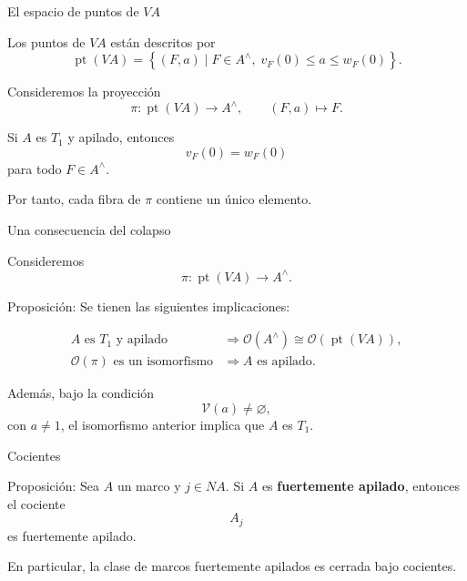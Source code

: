 \documentclass[compress,12pt]{beamer}
\begin{document}
\begin{frame}{El espacio de puntos de \(VA\)}

Los puntos de \(VA\) están descritos por
\[
    \operatorname{pt}(VA)
    =
    \left\{
        (F,a)\mid
        F\in A^\wedge,\;
        v_F(0)\leq a\leq w_F(0)
    \right\}.
\]

Consideremos la proyección
\[
    \pi\colon \operatorname{pt}(VA)\longrightarrow A^\wedge,
    \qquad
    (F,a)\longmapsto F.
\]

Si \(A\) es \(T_1\) y apilado, entonces
\[
    v_F(0)=w_F(0)
\]
para todo \(F\in A^\wedge\).

Por tanto, cada fibra de \(\pi\) contiene un único elemento.

\end{frame}

\begin{frame}{Una consecuencia del colapso}

Consideremos
\[
    \pi\colon\operatorname{pt}(VA)\longrightarrow A^\wedge.
\]

\begin{block}{Proposición:}
Se tienen las siguientes implicaciones:

\[
\begin{aligned}
A\text{ es }T_1\text{ y apilado}
&\Longrightarrow
\mathcal{O}(A^\wedge)
\cong
\mathcal{O}(\operatorname{pt}(VA)),
\\[0.4cm]
\mathcal{O}(\pi)\text{ es un isomorfismo}
&\Longrightarrow
A\text{ es apilado}.
\end{aligned}
\]

Además, bajo la condición
\[
    \mathcal{V}(a)\neq\varnothing,
\]
con $a\neq 1$, el isomorfismo anterior implica que \(A\) es \(T_1\).
\end{block}

\end{frame}

\begin{frame}{Cocientes}

\begin{block}{Proposición:}
Sea \(A\) un marco y \(j\in NA\). Si \(A\) es
\textbf{fuertemente apilado}, entonces el cociente
\[
    A_j
\]
es fuertemente apilado.
\end{block}

\vspace{0.5cm}

En particular, la clase de marcos fuertemente apilados
es cerrada bajo cocientes.

\end{frame}
\end{document}

